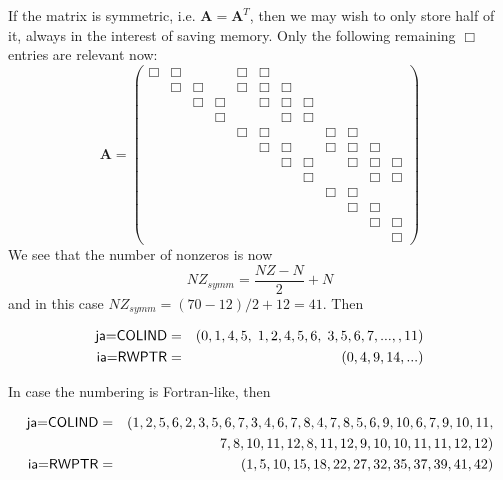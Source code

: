 If the matrix is symmetric, i.e. ${\bm A}={\bm A}^T$, then we may wish to 
only store half of it, always in the interest of saving memory. 
Only the following remaining $\Box$ entries are relevant now:
\[
{\bm A}=
\left(
\begin{array}{cccccccccccc}
\Box & \Box &      &      & \Box & \Box &      &      &      &      &      &      \\
     & \Box & \Box &      & \Box & \Box & \Box &      &      &      &      &      \\
     &      & \Box & \Box &      & \Box & \Box & \Box &      &      &      &      \\
     &      &      & \Box &      &      & \Box & \Box &      &      &      &      \\
     &      &      &      & \Box & \Box &      &      & \Box & \Box &      &      \\
     &      &      &      &      & \Box & \Box &      & \Box & \Box & \Box &      \\
     &      &      &      &      &      & \Box & \Box &      & \Box & \Box & \Box \\
     &      &      &      &      &      &      & \Box &      &      & \Box & \Box \\
     &      &      &      &      &      &      &      & \Box & \Box &      &      \\
     &      &      &      &      &      &      &      &      & \Box & \Box &      \\
     &      &      &      &      &      &      &      &      &      & \Box & \Box \\
     &      &      &      &      &      &      &      &      &      &      & \Box 
\end{array}
\right)
\]
We see that the number of nonzeros is now 
\[
NZ_{symm}= \frac{NZ-N}{2}+N
\]
and in this case $NZ_{symm}=(70-12)/2+12=41$.
Then 


\begin{eqnarray}
\text{\sffamily ja=COLIND}&=&(0,1,4,5, \; 1,2,4,5,6, \; 3,5,6,7, ..., ,11) \nonumber\\
\text{\sffamily ia=RWPTR} &=&(0,4,9,14, ... )   \nonumber
\end{eqnarray}

In case the numbering is Fortran-like, then 

\begin{eqnarray}
\text{\sffamily ja=COLIND}&=& (1, 2, 5, 6, 2, 3, 5, 6, 7,  3, 4, 6, 7, 8, 
4, 7, 8,  5, 6, 9, 10, 6, 7, 9, 10, 11, \nonumber\\
&& 7, 8, 10, 11, 12,  8, 11, 12,  9, 10,  10, 11,   11, 12,  12) \nonumber\\
\text{\sffamily ia=RWPTR} &=&(1, 5, 10, 15, 18, 22, 27, 32, 35, 37, 39, 41, 42)  \nonumber
\end{eqnarray}

